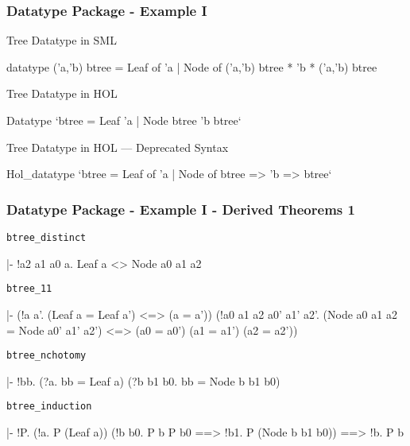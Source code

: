\begin{frame}[fragile]
\frametitle{Datatype Package - Example I}
\begin{block}{Tree Datatype in SML}
\begin{semiverbatim}\scriptsize
datatype ('a,'b) btree =   Leaf of 'a
                         | Node of ('a,'b) btree * 'b * ('a,'b) btree
\end{semiverbatim}
\end{block}

\begin{block}{Tree Datatype in HOL}
\begin{semiverbatim}\scriptsize
Datatype `btree =   Leaf 'a
                  | Node btree 'b btree`
\end{semiverbatim}
\end{block}

\begin{block}{Tree Datatype in HOL --- Deprecated Syntax}
\begin{semiverbatim}\scriptsize
Hol_datatype `btree =   Leaf of 'a
                      | Node of btree => 'b => btree`
\end{semiverbatim}
\end{block}

\end{frame}

\begin{frame}[fragile]
\frametitle{Datatype Package - Example I - Derived Theorems 1}
\begin{block}{\texttt{btree\_distinct}}
\begin{semiverbatim}\scriptsize
|- !a2 a1 a0 a. Leaf a <> Node a0 a1 a2
\end{semiverbatim}
\end{block}

\begin{block}{\texttt{btree\_11}}
\begin{semiverbatim}\scriptsize
|- (!a a'. (Leaf a = Leaf a') <=> (a = a')) \holAnd{}
   (!a0 a1 a2 a0' a1' a2'.
      (Node a0 a1 a2 = Node a0' a1' a2') <=>
      (a0 = a0') \holAnd{} (a1 = a1') \holAnd{} (a2 = a2'))
\end{semiverbatim}
\end{block}

\begin{block}{\texttt{btree\_nchotomy}}
\begin{semiverbatim}\scriptsize
|- !bb. (?a. bb = Leaf a) \holOr{} (?b b1 b0. bb = Node b b1 b0)
\end{semiverbatim}
\end{block}

\begin{block}{\texttt{btree\_induction}}
\begin{semiverbatim}\scriptsize
|- !P. (!a. P (Leaf a)) \holAnd{}
       (!b b0. P b \holAnd{} P b0 ==> !b1. P (Node b b1 b0)) ==>
       !b. P b
\end{semiverbatim}
\end{block}

\end{frame}


